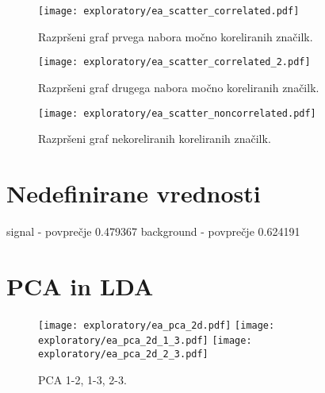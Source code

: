 
\begin{figure}[ht]
	\texttt{[image: exploratory/ea\_scatter\_correlated.pdf]}	
	\caption{Razpršeni graf prvega nabora močno koreliranih značilk.}
	\label{sl:scatter_corr}
\end{figure}

\begin{figure}[ht]	
	\texttt{[image: exploratory/ea\_scatter\_correlated\_2.pdf]}	
	\caption{Razpršeni graf drugega nabora močno koreliranih značilk.}
	\label{sl:scatter_corr2}
\end{figure}

\begin{figure}[ht]
	\texttt{[image: exploratory/ea\_scatter\_noncorrelated.pdf]}	
	\caption{Razpršeni graf nekoreliranih koreliranih značilk.}
	\label{sl:scatter_noncorr}			
\end{figure}

\clearpage

\section{Nedefinirane vrednosti}

signal - povprečje    0.479367
background - povprečje    0.624191



\section{PCA in LDA}
\begin{figure}[ht]	
	\texttt{[image: exploratory/ea\_pca\_2d.pdf]}
	\texttt{[image: exploratory/ea\_pca\_2d\_1\_3.pdf]}
	\texttt{[image: exploratory/ea\_pca\_2d\_2\_3.pdf]}		
	
	\caption{PCA 1-2, 1-3, 2-3.}
	\label{pca}
\end{figure}



